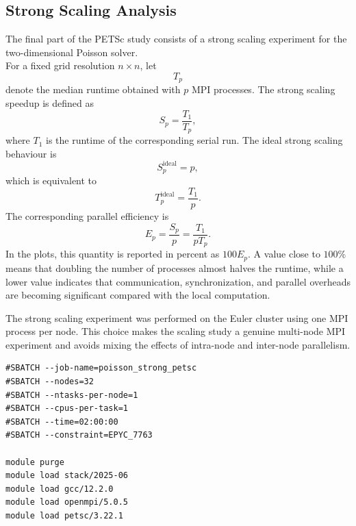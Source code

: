 \documentclass[unicode,10pt,a4paper,oneside,numbers=endperiod,openany]{scrartcl}
\begin{document}
\subsection{Strong Scaling Analysis}

The final part of the PETSc study consists of a strong scaling experiment for
the two-dimensional Poisson solver.\\
For a fixed grid resolution \(n \times n\), let
\[
    T_p
\]
denote the median runtime obtained with \(p\) MPI processes. The strong scaling
speedup is defined as
\begin{equation*}
    S_p = \frac{T_1}{T_p},
    \label{eq:strong_speedup}
\end{equation*}
where \(T_1\) is the runtime of the corresponding serial run. The ideal strong
scaling behaviour is
\begin{equation*}
    S_p^{\mathrm{ideal}} = p,
\end{equation*}
which is equivalent to
\begin{equation*}
    T_p^{\mathrm{ideal}} = \frac{T_1}{p}.
\end{equation*}
The corresponding parallel efficiency is
\begin{equation*}
    E_p = \frac{S_p}{p}
        = \frac{T_1}{pT_p}.
\end{equation*}
In the plots, this quantity is reported in percent as \(100E_p\). A value close
to \(100\%\) means that doubling the number of processes almost halves the
runtime, while a lower value indicates that communication, synchronization, and
parallel overheads are becoming significant compared with the local computation.

The strong scaling experiment was performed on the Euler cluster using one MPI
process per node. This choice makes the scaling study a genuine multi-node MPI
experiment and avoids mixing the effects of intra-node and inter-node
parallelism.

\begin{lstlisting}[style=grayverbatim, caption={SLURM configuration used for the strong scaling study}, label={lst:strong_scaling_slurm}]
#SBATCH --job-name=poisson_strong_petsc
#SBATCH --nodes=32
#SBATCH --ntasks-per-node=1
#SBATCH --cpus-per-task=1
#SBATCH --time=02:00:00
#SBATCH --constraint=EPYC_7763

module purge
module load stack/2025-06
module load gcc/12.2.0
module load openmpi/5.0.5
module load petsc/3.22.1
\end{lstlisting}
\end{document}

